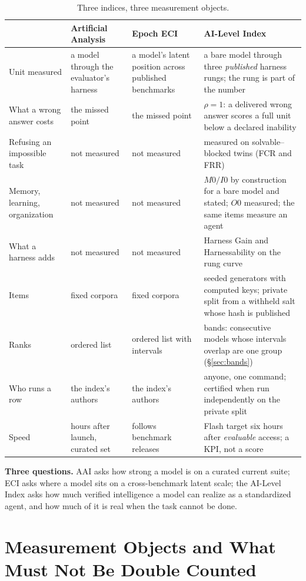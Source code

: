 \documentclass[11pt]{article}
\theoremstyle{definition}
\begin{document}
\begin{table}[!htbp]
\centering\small
\begin{tabularx}{\textwidth}{@{}p{3.1cm} Y Y Y@{}}
\toprule
 & Artificial Analysis & Epoch ECI & AI-Level Index \\
\midrule
Unit measured & a model through the evaluator's harness & a model's latent position across published benchmarks & a bare model through three \emph{published} harness rungs; the rung is part of the number \\
What a wrong answer costs & the missed point & the missed point & $\rho = 1$: a delivered wrong answer scores a full unit below a declared inability \\
Refusing an impossible task & not measured & not measured & measured on solvable--blocked twins (FCR and FRR) \\
Memory, learning, organization & not measured & not measured & $M0/I0$ by construction for a bare model and stated; $O0$ measured; the same items measure an agent \\
What a harness adds & not measured & not measured & Harness Gain and Harnessability on the rung curve \\
Items & fixed corpora & fixed corpora & seeded generators with computed keys; private split from a withheld salt whose hash is published \\
Ranks & ordered list & ordered list with intervals & bands: consecutive models whose intervals overlap are one group (\S\ref{sec:bands}) \\
Who runs a row & the index's authors & the index's authors & anyone, one command; certified when run independently on the private split \\
Speed & hours after launch, curated set & follows benchmark releases & Flash target six hours after \emph{evaluable} access; a KPI, not a score \\
\bottomrule
\end{tabularx}
\caption{Three indices, three measurement objects.}
\label{tab:related}
\end{table}

\textbf{Three questions.} AAI asks how strong a model is on a curated current suite; ECI asks where a model sits on a cross-benchmark latent scale; the AI-Level Index asks how much verified intelligence a model can realize as a standardized agent, and how much of it is real when the task cannot be done.

\section{Measurement Objects and What Must Not Be Double Counted}\label{sec:objects}
\end{document}
